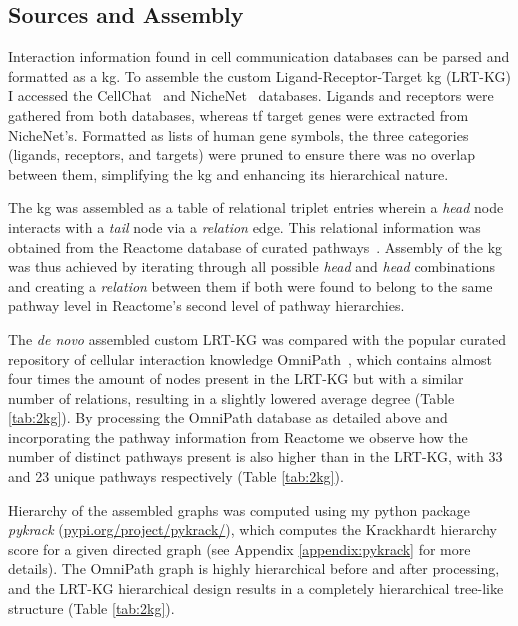 \subsection{Sources and Assembly}

Interaction information found in cell communication databases can be parsed and formatted as a \acrfull{kg}. To assemble the custom Ligand-Receptor-Target \acrshort{kg} (LRT-KG) I accessed the CellChat~\cite{jin_sqjincellchat_2021} and NicheNet~\cite{browaeys_nichenet_2020} databases. Ligands and receptors were gathered from both databases, whereas \acrfull{tf} target genes were extracted from NicheNet's. Formatted as lists of human gene symbols, the three categories (ligands, receptors, and targets) were pruned to ensure there was no overlap between them, simplifying the \acrshort{kg} and enhancing its hierarchical nature. 

The \acrshort{kg} was assembled as a table of relational triplet entries wherein a \emph{head} node interacts with a \emph{tail} node via a \emph{relation} edge. This relational information was obtained from the Reactome database of curated pathways~\cite{gillespie_reactome_2022}. Assembly of the \acrshort{kg} was thus achieved by iterating through all possible \emph{head} and \emph{head} combinations and creating a \emph{relation} between them if both were found to belong to the same pathway level in Reactome's second level of pathway hierarchies.

The \emph{de novo} assembled custom LRT-KG was compared with the popular curated repository of cellular interaction knowledge OmniPath~\cite{turei_integrated_2021}, which contains almost four times the amount of nodes present in the LRT-KG but with a similar number of relations, resulting in a slightly lowered average degree (Table \ref{tab:2kg}). By processing the OmniPath database as detailed above and incorporating the pathway information from Reactome we observe how the number of distinct pathways present is also higher than in the LRT-KG, with 33 and 23 unique pathways respectively (Table \ref{tab:2kg}).

Hierarchy of the assembled graphs was computed using my python package \emph{pykrack} (\url{pypi.org/project/pykrack/}), which computes the Krackhardt hierarchy score for a given directed graph (see Appendix \ref{appendix:pykrack} for more details). The OmniPath graph is highly hierarchical before and after processing, and the LRT-KG hierarchical design results in a completely hierarchical tree-like structure (Table \ref{tab:2kg}).

